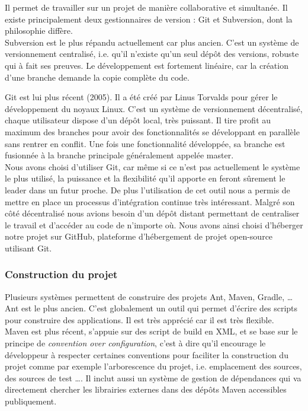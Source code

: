 Il permet de travailler sur un projet de manière collaborative et simultanée. Il existe principalement deux gestionnaires de version : Git et Subversion, dont la philosophie diffère.\\

Subversion est le plus répandu actuellement car plus ancien. C'est un système de versionnement centralisé, i.e. qu'il n'existe qu'un seul dépôt des versions, robuste qui à fait ses preuves. Le développement est fortement linéaire, car la création d'une branche demande la copie complète du code.

Git est lui plus récent (2005). Il a été créé par Linus Torvalds pour gérer le développement du noyaux Linux. C'est un système de versionnement décentralisé, chaque utilisateur dispose d'un dépôt local, très puissant. Il tire profit au maximum des branches pour avoir des fonctionnalités se développant en parallèle sans rentrer en conflit. Une fois une fonctionnalité développée, sa branche est fusionnée à la branche principale généralement appelée master.\\

Nous avons choisi d'utiliser Git, car même si ce n'est pas actuellement le système le plus utilisé, la puissance et la flexibilité qu'il apporte en feront sûrement le leader dans un futur proche. De plus l'utilisation de cet outil nous a permis de mettre en place un processus d'intégration continue très intéressant. Malgré son côté décentralisé nous avions besoin d'un dépôt distant permettant de centraliser le travail et d'accéder au code de n'importe où. Nous avons ainsi choisi d'héberger notre projet sur GitHub, plateforme d'hébergement de projet open-source utilisant Git. 

\subsubsection{Construction du projet}

Plusieurs systèmes permettent de construire des projets Ant, Maven, Gradle, \dots{} Ant est le plus ancien. C'est globalement un outil qui permet d'écrire des scripts pour construire des applications. Il est très apprécié car il est très flexible.\\

Maven est plus récent, s'appuie sur des script de build en XML, et se base sur le principe de \textit{convention over configuration}, c'est à dire qu'il encourage le développeur à respecter certaines conventions pour faciliter la construction du projet comme par exemple l'arborescence du projet, i.e. emplacement des sources, des sources de test \dots{}. Il inclut aussi un système de gestion de dépendances qui va directement chercher les librairies externes dans des dépôts Maven accessibles publiquement.\\

